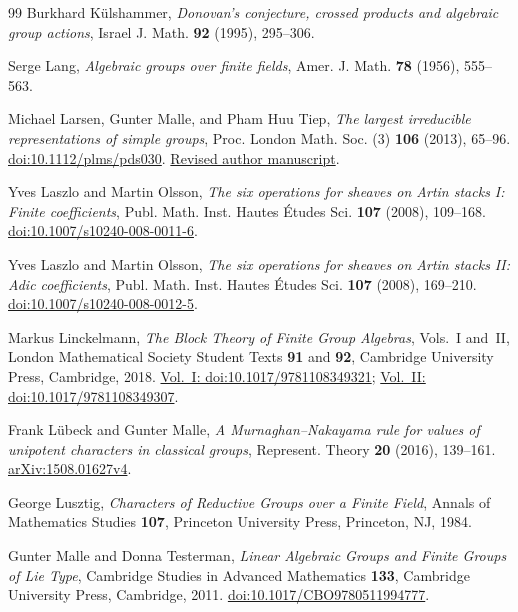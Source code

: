 \begin{thebibliography}{99}
Burkhard K\"ulshammer,
\emph{Donovan's conjecture, crossed products and algebraic group actions},
Israel J. Math. \textbf{92} (1995), 295--306.

Serge Lang,
\emph{Algebraic groups over finite fields},
Amer. J. Math. \textbf{78} (1956), 555--563.

Michael Larsen, Gunter Malle, and Pham Huu Tiep,
\emph{The largest irreducible representations of simple groups},
Proc. London Math. Soc. (3) \textbf{106} (2013), 65--96.
\href{https://doi.org/10.1112/plms/pds030}{doi:10.1112/plms/pds030}.
\href{https://agag-malle.math.rptu.de/~malle/download/largedegs.pdf}{Revised author manuscript}.

Yves Laszlo and Martin Olsson,
\emph{The six operations for sheaves on Artin stacks I: Finite coefficients},
Publ. Math. Inst. Hautes \'Etudes Sci. \textbf{107} (2008), 109--168.
\href{https://doi.org/10.1007/s10240-008-0011-6}{doi:10.1007/s10240-008-0011-6}.

Yves Laszlo and Martin Olsson,
\emph{The six operations for sheaves on Artin stacks II: Adic coefficients},
Publ. Math. Inst. Hautes \'Etudes Sci. \textbf{107} (2008), 169--210.
\href{https://doi.org/10.1007/s10240-008-0012-5}{doi:10.1007/s10240-008-0012-5}.

Markus Linckelmann,
\emph{The Block Theory of Finite Group Algebras}, Vols.~I and~II,
London Mathematical Society Student Texts \textbf{91} and \textbf{92},
Cambridge University Press, Cambridge, 2018.
\href{https://doi.org/10.1017/9781108349321}{Vol.~I: doi:10.1017/9781108349321};
\href{https://doi.org/10.1017/9781108349307}{Vol.~II: doi:10.1017/9781108349307}.

Frank L\"ubeck and Gunter Malle,
\emph{A Murnaghan--Nakayama rule for values of unipotent characters
in classical groups},
Represent. Theory \textbf{20} (2016), 139--161.
\href{https://arxiv.org/abs/1508.01627v4}{arXiv:1508.01627v4}.

George Lusztig,
\emph{Characters of Reductive Groups over a Finite Field},
Annals of Mathematics Studies \textbf{107},
Princeton University Press, Princeton, NJ, 1984.

Gunter Malle and Donna Testerman,
\emph{Linear Algebraic Groups and Finite Groups of Lie Type},
Cambridge Studies in Advanced Mathematics \textbf{133},
Cambridge University Press, Cambridge, 2011.
\href{https://doi.org/10.1017/CBO9780511994777}{doi:10.1017/CBO9780511994777}.


\end{thebibliography}
